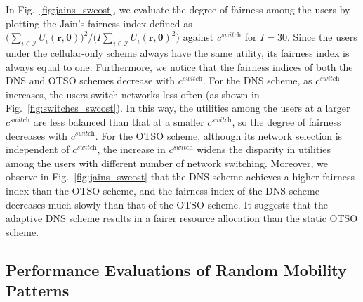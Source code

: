 \documentclass[journal]{IEEEtran}
\begin{document}
	In Fig.~\ref{fig:jains_swcost}, we evaluate the degree of fairness among the users by plotting the Jain's fairness index \cite{jain_aq84} defined as $\bigl( \sum_{i \in \mathcal{I}} U_i(\boldsymbol{r},\boldsymbol{\theta}) \bigr)^2 / \bigl( I \sum_{i \in \mathcal{I}} U_i(\boldsymbol{r},\boldsymbol{\theta})^2 \bigr)$ against $c^{\textit{switch}}$ for $I = 30$. 	
  Since the users under the cellular-only scheme always have the same utility, its fairness index is always equal to one.
  Furthermore, we notice that the fairness indices of both the DNS and OTSO schemes decrease with $c^{\textit{switch}}$. For the DNS scheme, as $c^{\textit{switch}}$ increases, the users switch networks less often (as shown in Fig.~\ref{fig:switches_swcost}). In this way, the utilities among the users at a larger $c^{\textit{switch}}$ are less balanced than that at a smaller $c^{\textit{switch}}$, so the degree of fairness decreases with $c^{\textit{switch}}$. 
  For the OTSO scheme, although its network selection is independent of $c^{\textit{switch}}$, the increase in $c^{\textit{switch}}$ widens the disparity in utilities among the users with different number of network switching.
  Moreover, we observe in Fig.~\ref{fig:jains_swcost} that the DNS scheme achieves a higher fairness index than the OTSO scheme, and the fairness index of the DNS scheme decreases much slowly than that of the OTSO scheme. It suggests that the adaptive DNS scheme results in a fairer resource allocation than the static OTSO scheme.	

	
	


\subsection{Performance Evaluations of Random Mobility Patterns}
\end{document}
